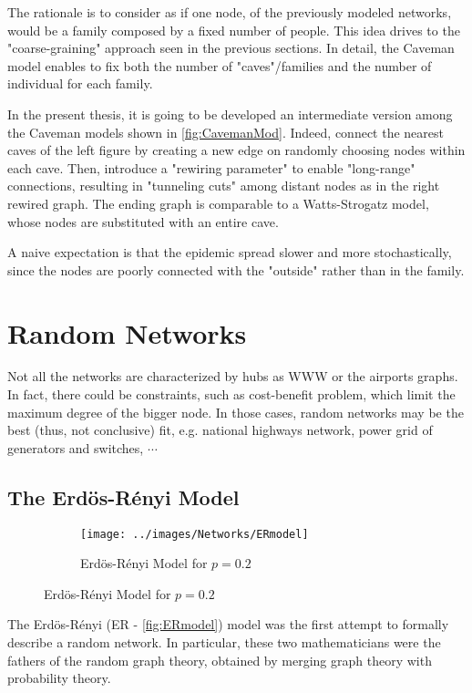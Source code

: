 \documentclass[a4paper,10pt,twoside]{book} %
\theoremstyle{definition}
\begin{document}
The rationale is to consider as if one node, of the previously modeled networks, would be a family composed by a fixed number of people. This idea drives to the "coarse-graining" approach seen in the previous sections.
In detail, the Caveman model enables to fix both the number of "caves"/families and the number of individual for each family. 

In the present thesis, it is going to be developed an intermediate version among the Caveman models shown in \autoref{fig:CavemanMod}. Indeed, connect the nearest caves of the left figure by creating a new edge on randomly choosing nodes within each cave. Then, introduce a "rewiring parameter" to enable "long-range" connections, resulting in "tunneling cuts" among distant nodes as in the right rewired graph. The ending graph is comparable to a Watts-Strogatz model, whose nodes are substituted with an entire cave.

A naive expectation is that the epidemic spread slower and more stochastically, since the nodes are poorly connected with the "outside" rather than in the family.

\section{Random Networks}
Not all the networks are characterized by hubs as WWW or the airports graphs.
In fact, there could be constraints, such as cost-benefit problem, which limit the maximum degree of the bigger node. In those cases, random networks may be the best (thus, not conclusive) fit, e.g. national highways network, power grid of generators and switches, $\cdots$

\subsection{The Erdös-Rényi Model}
\label{sec:ER_model}

\begin{figure}[ht]
    \begin{subfigure}{\textwidth}
        \texttt{[image: ../images/Networks/ERmodel]}
        \centering
        \caption{Erdös-Rényi Model for $p = 0.2$ \cite{Baronchelli:2017_EpidSpreadCompNets}}
        \label{fig:ERmodel}
    \end{subfigure}
\end{figure}

The Erdös-Rényi (ER - \autoref{fig:ERmodel}) model was the first attempt to formally describe a random network. 
In particular, these two mathematicians were the fathers of the random graph theory, obtained by merging graph theory with probability theory.
\end{document}
